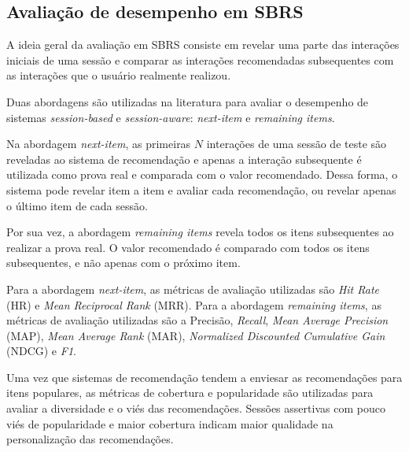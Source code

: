 
  \subsection{Avaliação de desempenho em SBRS}
  A ideia geral da avaliação em SBRS consiste em revelar uma parte das interações
  iniciais de uma sessão e comparar as interações recomendadas subsequentes com
  as interações que o usuário realmente realizou.
  
  Duas abordagens são utilizadas na literatura para avaliar o desempenho de
  sistemas \textit{session-based} e \textit{session-aware}: \textit{next-item}
  e \textit{remaining items}.

  Na abordagem \textit{next-item}, as primeiras $N$ interações de uma sessão de
  teste são reveladas ao sistema de recomendação e apenas a interação
  subsequente é utilizada como prova real e comparada com o valor recomendado.
  Dessa forma, o sistema pode revelar item a item e avaliar cada recomendação,
  ou revelar apenas o último item de cada sessão.

  Por sua vez, a abordagem \textit{remaining items} revela todos os itens
  subsequentes ao realizar a prova real. O valor recomendado é comparado
  com todos os itens subsequentes, e não apenas com o próximo item.

   
    Para a abordagem \textit{next-item}, as métricas
  de avaliação utilizadas são \textit{Hit Rate} (HR) e \textit{Mean Reciprocal
  Rank} (MRR). Para a abordagem \textit{remaining items}, as métricas de
  avaliação utilizadas são a Precisão, \textit{Recall}, \textit{Mean Average
  Precision} (MAP), \textit{Mean Average Rank} (MAR), \textit{Normalized
  Discounted Cumulative Gain} (NDCG) e \textit{F1}.

  Uma vez que sistemas de recomendação tendem a enviesar as recomendações para
  itens populares, as métricas de cobertura e popularidade são utilizadas para
  avaliar a diversidade e o viés das recomendações. Sessões assertivas com pouco
  viés de popularidade e maior cobertura indicam maior qualidade na
  personalização das recomendações.

